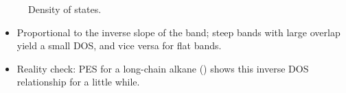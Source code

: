 \documentclass[../notes.tex]{subfiles}
\begin{document}
\begin{itemize}
\begin{figure}[h!]
        \caption{Density of states.}
        \label{fig:densityOfStates}
    \end{figure}
    \begin{itemize}
        \item Proportional to the inverse slope of the band; steep bands with large overlap yield a small DOS, and vice versa for flat bands.
        \item Reality check: PES for a long-chain alkane () shows this inverse DOS relationship for a little while.
    \end{itemize}
\end{itemize}
\end{document}
